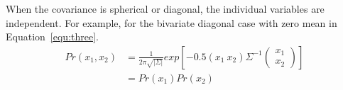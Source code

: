 \documentclass[10pt,twocolumn,letterpaper]{article}
\begin{document}
\par When the covariance is spherical or diagonal, the individual variables are independent. For example, for the bivariate diagonal case with zero mean in Equation~\ref{equ:three}.
\begin{equation}
\begin{split}
Pr(x_1, x_2)& = \frac{1}{2\pi\sqrt{|\Sigma|}}exp[-0.5(x_1~x_2)\Sigma^{-1}\begin{pmatrix}
x_1\\
x_2\end{pmatrix}]\\
&=Pr(x_1)Pr(x_2)
   \label{equ:three}
\end{split}
\end{equation}

{\small


}
\end{document}
